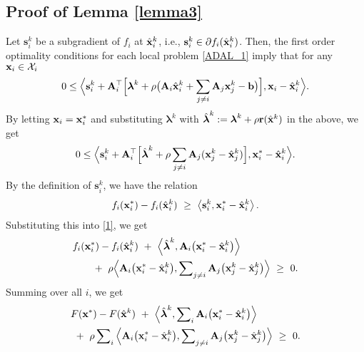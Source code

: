 \documentclass[doublecolumn]{IEEEtran}
\begin{document}
\subsection{Proof of Lemma \ref{lemma3}}\label{app:B}
Let ${\mathbf{s}}_i^k$ be a subgradient of $f_i$ at $\hat{ {\bf x} }_i^k$, i.e., $ {\mathbf{s}}_i^k \in \partial f_i(\hat{ {\bf x} }_i^k)$.
Then, the first order optimality conditions \cite[Proposition 4.7.1]{Berts1} for each local problem \eqref{ADAL_1} imply that for any ${ {\bf x} }_i \in \mathcal{X}_i$
\begin{align*}
0\leq  \Big\langle {\mathbf{s}}_i^k  +  { {\bf A} }_i^\top \Big[ {\boldsymbol{\lambda}}^k + \rho  \big({ {\bf A} }_i\hat{ {\bf x} }_i^k + \sum_{j\neq i}{ {\bf A} }_j { {\bf x} }_j^k -{ {\bf b} }\big)\Big], { {\bf x} }_i-\hat{ {\bf x} }_i^k  \Big\rangle .
\end{align*}
By letting ${ {\bf x} }_i = { {\bf x} }_i^*$ and substituting ${\boldsymbol{\lambda}}^k$ with $\hat{\boldsymbol{\lambda}}^k:={\boldsymbol{\lambda}}^k+\rho { {\bf r} }(\hat{ {\bf x} }^k)$ in the above, we get
\begin{align}\label{1}
0\leq  \Big\langle {\mathbf{s}}_i^k  +  { {\bf A} }_i^\top \Big[ \hat{\boldsymbol{\lambda}}^k + \rho  \sum_{j\neq i}{ {\bf A} }_j ( { {\bf x} }_j^k - \hat{ {\bf x} }_j^k )\Big], { {\bf x} }_i^*-\hat{ {\bf x} }_i^k  \Big\rangle .
\end{align}
By the definition of ${\mathbf{s}}_i^k$, we have the relation
\begin{align}\label{subgr}
f_i({ {\bf x} }_i^*) - f_i(\hat{ {\bf x} }_i^k) ~\geq~ \left\langle {\mathbf{s}}_i^k, { {\bf x} }_i^* - \hat{ {\bf x} }_i^k \right\rangle.
\end{align}
Substituting this into \eqref{1}, we get
\begin{align*}
& f_i({ {\bf x} }_i^*) - f_i(\hat{ {\bf x} }_i^k) ~+~  \Big\langle \hat{\boldsymbol{\lambda}}^k , { {\bf A} }_i \big({ {\bf x} }_i^*-\hat{ {\bf x} }_i^k \big) \Big\rangle  \\
& \qquad +~ \rho \Big\langle { {\bf A} }_i\big(  { {\bf x} }_i^*-\hat{ {\bf x} }_i^k \big) ,  \sum\nolimits_{j\neq i} { {\bf A} }_j \big( { {\bf x} }_j^{k} - {\hat{\mathbf x}}_j^k\big) \Big\rangle   ~\geq~ 0.\notag
\end{align*}
Summing over all $i$, we get
\begin{align*}
& F({ {\bf x} }^*) - F(\hat{ {\bf x} }^k) ~+~  \Big\langle \hat{\boldsymbol{\lambda}}^k , \sum\nolimits_i{ {\bf A} }_i \big({ {\bf x} }_i^*-\hat{ {\bf x} }_i^k \big) \Big\rangle  \\
&~+~ \rho \sum\nolimits_i \Big\langle { {\bf A} }_i\big({ {\bf x} }_i^*-\hat{ {\bf x} }_i^k\big) , \sum\nolimits_{j\neq i}{ {\bf A} }_j \big( { {\bf x} }_j^k- \hat{ {\bf x} }_j^k \big)\Big\rangle  ~\geq~ 0.
\end{align*}
\end{document}
